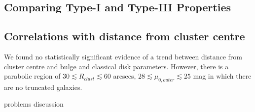 
\subsection{Comparing Type-I and Type-III Properties} %
\label{sub:comparing_type_i_and_type_iii}

\begin{figure}
	\label{meta graph of correlations between}
\end{figure}



\subsection{Correlations with distance from cluster centre} %
\label{sub:correlations}
We found no statistically significant evidence of a trend between distance from cluster centre and bulge and classical disk parameters. However, there is a parabolic region of $30 \lesssim R_{clust} \lesssim 60$ arcsecs, $28 \lesssim \mu_{0,outer} \lesssim 25$ mag in which there are no truncated galaxies.
\begin{figure}
	\label{correlations graph}
\end{figure}



problems discussion